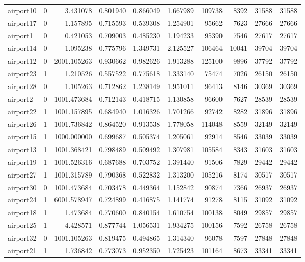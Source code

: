 \begin{longtable}{|l|r|r|r|r|r|r|r|r|r|}
airport10 & 0 & 3.431078 & 0.801940 & 0.866049 & 1.667989 & 109738 & 8392 & 31588 & 31588 \\
airport17 & 0 & 1.157895 & 0.715593 & 0.539308 & 1.254901 & 95662 & 7623 & 27666 & 27666 \\
airport1 & 0 & 0.421053 & 0.709003 & 0.485230 & 1.194233 & 95390 & 7546 & 27617 & 27617 \\
airport14 & 0 & 1.095238 & 0.775796 & 1.349731 & 2.125527 & 106464 & 10041 & 39704 & 39704 \\
airport12 & 0 & 2001.105263 & 0.930662 & 0.982626 & 1.913288 & 125100 & 9896 & 37792 & 37792 \\
airport23 & 1 & 1.210526 & 0.557522 & 0.775618 & 1.333140 & 75474 & 7026 & 26150 & 26150 \\
airport28 & 0 & 1.105263 & 0.712862 & 1.238149 & 1.951011 & 96413 & 8146 & 30369 & 30369 \\
airport2 & 0 & 1001.473684 & 0.712143 & 0.418715 & 1.130858 & 96600 & 7627 & 28539 & 28539 \\
airport22 & 1 & 1001.157895 & 0.684940 & 1.016326 & 1.701266 & 92742 & 8282 & 31896 & 31896 \\
airport26 & 1 & 1001.736842 & 0.864520 & 0.913538 & 1.778058 & 114048 & 8559 & 32149 & 32149 \\
airport15 & 1 & 1000.000000 & 0.699687 & 0.505374 & 1.205061 & 92914 & 8546 & 33039 & 33039 \\
airport13 & 1 & 1001.368421 & 0.798489 & 0.509492 & 1.307981 & 105584 & 8343 & 31603 & 31603 \\
airport19 & 1 & 1001.526316 & 0.687688 & 0.703752 & 1.391440 & 91506 & 7829 & 29442 & 29442 \\
airport27 & 1 & 1001.315789 & 0.790368 & 0.522832 & 1.313200 & 105216 & 8174 & 30517 & 30517 \\
airport30 & 0 & 1001.473684 & 0.703478 & 0.449364 & 1.152842 & 90874 & 7366 & 26937 & 26937 \\
airport24 & 1 & 6001.578947 & 0.724899 & 0.416875 & 1.141774 & 91278 & 8115 & 31092 & 31092 \\
airport18 & 1 & 1.473684 & 0.770600 & 0.840154 & 1.610754 & 100138 & 8049 & 29857 & 29857 \\
airport25 & 1 & 4.428571 & 0.877744 & 1.056531 & 1.934275 & 100156 & 7592 & 26758 & 26758 \\
airport32 & 0 & 1001.105263 & 0.819475 & 0.494865 & 1.314340 & 96078 & 7597 & 27848 & 27848 \\
airport21 & 1 & 1.736842 & 0.773073 & 0.952350 & 1.725423 & 101164 & 8673 & 33341 & 33341 \\

\end{longtable}
